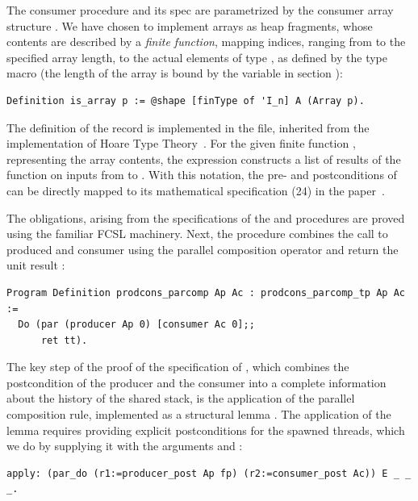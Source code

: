 The consumer procedure and its spec are parametrized by the consumer
array structure . We have chosen to implement arrays as heap
fragments, whose contents are described by a \emph{finite function},
mapping indices, ranging from  to the specified array length,
to the actual elements of type , as defined by the type macro
\code{[finType of 'I_n]} (the length of the array is bound by the
variable  in section ):

\begin{lstlisting}
Definition is_array p := @shape [finType of 'I_n] A (Array p).  
\end{lstlisting}

The definition of the record  is implemented in the
 file, inherited from the implementation of Hoare Type
Theory~\cite{Nanevski-al:POPL10}.
%
For the given finite function , representing the array
contents, the expression  constructs a list
of results of the function on inputs from  to . With
this notation, the pre- and postconditions of  can be
directly mapped to its mathematical specification (24) in the
paper~\cite{Sergey-al:ESOP15}.

The obligations, arising from the specifications of the 
and  procedures are proved using the familiar FCSL
machinery. Next, the procedure  combines the
call to produced and consumer using the parallel composition operator
and return the unit result :

\begin{lstlisting}
Program Definition prodcons_parcomp Ap Ac : prodcons_parcomp_tp Ap Ac := 
  Do (par (producer Ap 0) [consumer Ac 0];; 
      ret tt).  
\end{lstlisting}

The key step of the proof of the specification of
, which combines the postcondition of the
producer and the consumer into a complete information about the
history of the shared stack, is the application of the parallel
composition rule, implemented as a structural lemma . The
application of the lemma requires providing explicit postconditions
for the spawned threads, which we do by supplying it with the
arguments  and :

\begin{lstlisting}
apply: (par_do (r1:=producer_post Ap fp) (r2:=consumer_post Ac)) E _ _ _.  
\end{lstlisting}

